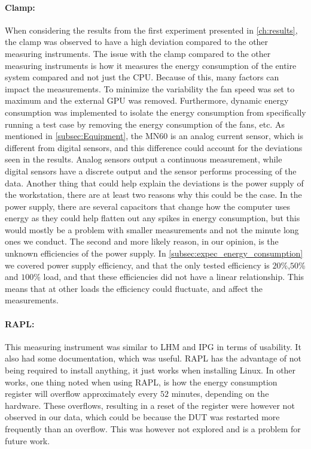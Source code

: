 \paragraph*{Clamp:} When considering the results from the first experiment presented in \cref{ch:results}, the clamp was observed to have a high deviation compared to the other measuring instruments. The issue with the clamp compared to the other measuring instruments is how it measures the energy consumption of the entire system compared and not just the CPU. Because of this, many factors can impact the measurements. To minimize the variability the fan speed was set to maximum and the external GPU was removed. Furthermore, dynamic energy consumption was implemented to isolate the energy consumption from specifically running a test case by removing the energy consumption of the fans, etc. As mentioned in \cref{subsec:Equipment}, the MN60 is an analog current sensor, which is different from digital sensors, and this difference could account for the deviations seen in the results. Analog sensors output a continuous measurement, while digital sensors have a discrete output and the sensor performs processing of the data.\cite{DigimonsVSAnamons} Another thing that could help explain the deviations is the power supply of the workstation, there are at least two reasons why this could be the case. In the power supply, there are several capacitors that change how the computer uses energy as they could help flatten out any spikes in energy consumption, but this would mostly be a problem with smaller measurements and not the minute long ones we conduct\cite{hackenberg2013}. The second and more likely reason, in our opinion, is the unknown efficiencies of the power supply. In \cref{subsec:expec_energy_consumption} we covered power supply efficiency, and that the only tested efficiency is $20$\%,$50$\% and $100$\% load, and that these efficiencies did not have a linear relationship. This means that at other loads the efficiency could fluctuate, and affect the measurements. 


\paragraph*{RAPL:} This measuring instrument was similar to LHM and IPG in terms of usability. It also had some documentation, which was useful. RAPL has the advantage of not being required to install anything, it just works when installing Linux. In other works\cite{RAPL_in_action}, one thing noted when using RAPL, is how the energy consumption register will overflow approximately every $52$ minutes, depending on the hardware. These overflows, resulting in a reset of the register were however not observed in our data, which could be because the DUT was restarted more frequently than an overflow. This was however not explored and is a problem for future work.

